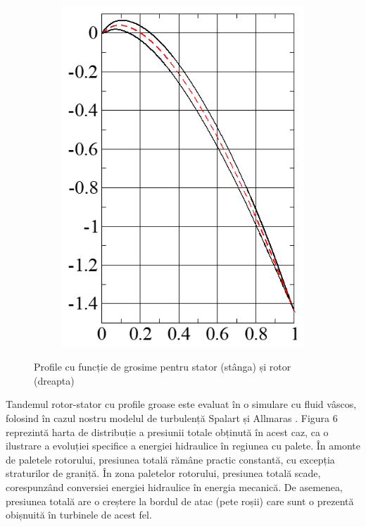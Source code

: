 \begin{figure}[h]
\begin{subfigure}[t]{0.42\textwidth}
    \includegraphics[width=\textwidth]{figures/rotor-thick-blade.PNG}
  \end{subfigure}
  \caption{Profile cu funcție de grosime pentru stator (stânga) și rotor (dreapta)}
\end{figure}


Tandemul rotor-stator cu profile groase este evaluat în o simulare cu fluid vâscos, folosind în cazul nostru modelul de turbulență Spalart și Allmaras \cite{spalart1992one}. Figura 6 reprezintă harta de distribuție a presiunii totale obținută în acest caz, ca o ilustrare a evoluției specifice a energiei hidraulice în regiunea cu palete. În amonte de paletele rotorului, presiunea totală rămâne practic constantă, cu excepția straturilor de graniță. În zona paletelor rotorului, presiunea totală scade, corespunzând conversiei energiei hidraulice în energia mecanică. De asemenea, presiunea totală are o creștere la bordul de atac (pete roșii) care sunt o prezentă obișnuită în turbinele de acest fel.

